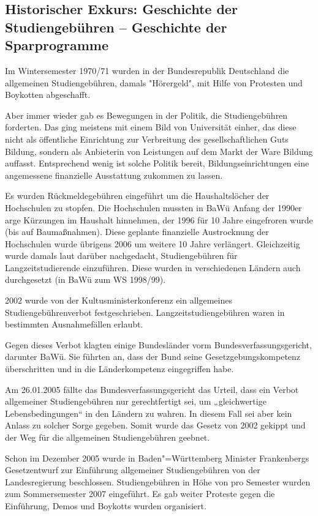 \iffalse
\subsection*{Historischer Exkurs: Geschichte der Studiengebühren -- Geschichte der Sparprogramme}

Im Wintersemester 1970/71 wurden in der Bundesrepublik Deutschland die allgemeinen Studiengebühren, damals "Hörergeld", mit Hilfe von Protesten und Boykotten abgeschafft.

Aber immer wieder gab es Bewegungen in der Politik, die Studiengebühren forderten. Das ging meistens mit einem Bild von Universität einher, das diese nicht als öffentliche Einrichtung zur Verbreitung des gesellschaftlichen Guts Bildung, sondern als Anbieterin von Leistungen auf dem Markt der Ware Bildung auffasst. Entsprechend wenig ist solche Politik bereit, Bildungseinrichtungen eine angemessene finanzielle Ausstattung zukommen zu lassen.

Es wurden Rückmeldegebühren eingeführt um die Haushaltslöcher der Hochschulen zu stopfen. Die Hochschulen mussten in BaWü Anfang der 1990er arge Kürzungen im Haushalt hinnehmen, der 1996 für 10 Jahre eingefroren wurde (bis auf Baumaßnahmen). Diese geplante finanzielle Austrocknung der Hochschulen wurde übrigens 2006 um weitere 10 Jahre verlängert. Gleichzeitig wurde damals laut darüber nachgedacht, Studiengebühren für Langzeitstudierende einzuführen. Diese wurden in verschiedenen Ländern auch durchgesetzt (in BaWü zum WS 1998/99).

2002 wurde von der Kultusministerkonferenz ein allgemeines Studiengebührenverbot festgeschrieben. Langzeitstudiengebühren waren in bestimmten Ausnahmefällen erlaubt.

Gegen dieses Verbot klagten einige Bundesländer vorm Bundesverfassungsgericht, darunter BaWü. Sie führten an, dass der Bund seine Gesetzgebungskompetenz überschritten und in die Länderkompetenz eingegriffen habe.

Am 26.01.2005 fällte das Bundesverfassungsgericht das Urteil, dass ein Verbot allgemeiner Studiengebühren nur gerechtfertigt sei, um „gleichwertige Lebensbedingungen“ in den Ländern zu wahren. In diesem Fall sei aber kein Anlass zu solcher Sorge gegeben. Somit wurde das Gesetz von 2002 gekippt und der Weg für die allgemeinen Studiengebühren geebnet.

Schon im Dezember 2005 wurde in Baden"=Württemberg Minister Frankenbergs Gesetzentwurf zur Einführung allgemeiner Studiengebühren von der Landesregierung beschlossen. Studiengebühren in Höhe von  pro Semester wurden zum Sommersemester 2007 eingeführt. Es gab weiter Proteste gegen die Einführung, Demos und Boykotts wurden organisiert.


